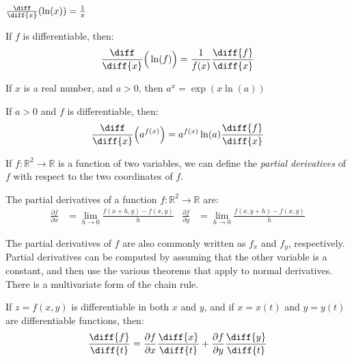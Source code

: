 \documentclass[crop=false,class=book,oneside]{standalone}                      %
\begin{document}
        \begin{theorem}
            $\frac{\diff}{\diff{x}}(\ln(x))=\frac{1}{x}$
        \end{theorem}
        \begin{theorem}
            If $f$ is differentiable, then:
            \begin{equation*}
                \frac{\diff}{\diff{x}}\Big(\ln(f)\Big)
                =\frac{1}{f(x)}\frac{\diff{f}}{\diff{x}}
            \end{equation*}
        \end{theorem}
        \begin{theorem}
            If $x$ is a real number, and $a>0$, then
            $a^{x}=\exp(x\ln(a))$
        \end{theorem}
        \begin{theorem}
            If $a>0$ and $f$ is differentiable, then:
            \begin{equation*}
                \frac{\diff}{\diff{x}}\Big(a^{f(x)}\Big)
                =a^{f(x)}\ln(a)\frac{\diff{f}}{\diff{x}}
            \end{equation*}
        \end{theorem}
        If $f:\mathbb{R}^{2}\rightarrow\mathbb{R}$ is a function
        of two variables, we can define the
        \textit{partial derivatives} of $f$ with respect to
        the two coordinates of $f$.
        \begin{definition}
            The partial derivatives of a function
            $f:\mathbb{R}^{2}\rightarrow\mathbb{R}$ are:
            \begin{align*}
                \frac{\partial{f}}{\partial{x}}
                &=\lim_{h\rightarrow{0}}\frac{f(x+h,y)-f(x,y)}{h}
                &
                \frac{\partial{f}}{\partial{y}}
                &=\lim_{h\rightarrow{0}}\frac{f(x,y+h)-f(x,y)}{h}  
            \end{align*}
        \end{definition}
        The partial derivatives of $f$ are also commonly written as
        $f_{x}$ and $f_{y}$, respectively. Partial derivatives can be
        computed by assuming that the other variable is a constant,
        and then use the various theorems that apply to normal
        derivatives. There is a multivariate form of the chain rule.
        \begin{theorem}
            If $z=f(x,y)$ is differentiable in both $x$ and $y$, and
            if $x=x(t)$ and $y=y(t)$ are differentiable functions, then:
            \begin{equation*}
                \frac{\diff{f}}{\diff{t}}
                =\frac{\partial{f}}{\partial{x}}\frac{\diff{x}}{\diff{t}}
                +\frac{\partial{f}}{\partial{y}}\frac{\diff{y}}{\diff{t}}
            \end{equation*}
        \end{theorem}
\end{document}
